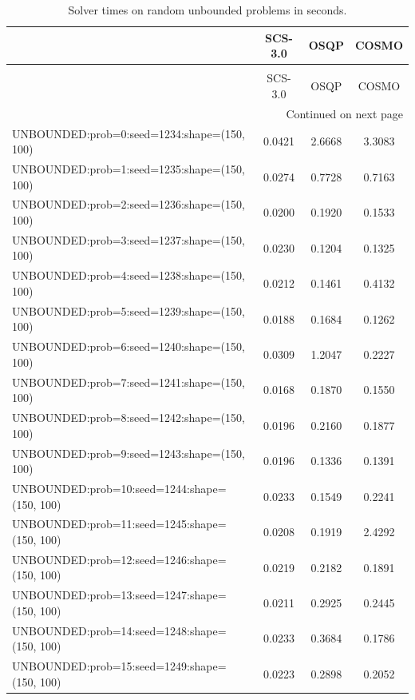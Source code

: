 \begin{longtable}{lccc}
\caption{Solver times on random unbounded problems in seconds.}
\label{t-random unbounded-results}\\
\toprule
{} &  SCS-3.0 &    OSQP &   COSMO \\
\midrule
\endfirsthead
\caption[]{Solver times on random unbounded problems in seconds.} \\
\toprule
{} &  SCS-3.0 &    OSQP &   COSMO \\
\midrule
\endhead
\midrule
\multicolumn{4}{r}{{Continued on next page}} \\
\midrule
\endfoot

\bottomrule
\endlastfoot
UNBOUNDED:prob=0:seed=1234:shape=(150, 100)   &   0.0421 &  2.6668 &  3.3083 \\
UNBOUNDED:prob=1:seed=1235:shape=(150, 100)   &   0.0274 &  0.7728 &  0.7163 \\
UNBOUNDED:prob=2:seed=1236:shape=(150, 100)   &   0.0200 &  0.1920 &  0.1533 \\
UNBOUNDED:prob=3:seed=1237:shape=(150, 100)   &   0.0230 &  0.1204 &  0.1325 \\
UNBOUNDED:prob=4:seed=1238:shape=(150, 100)   &   0.0212 &  0.1461 &  0.4132 \\
UNBOUNDED:prob=5:seed=1239:shape=(150, 100)   &   0.0188 &  0.1684 &  0.1262 \\
UNBOUNDED:prob=6:seed=1240:shape=(150, 100)   &   0.0309 &  1.2047 &  0.2227 \\
UNBOUNDED:prob=7:seed=1241:shape=(150, 100)   &   0.0168 &  0.1870 &  0.1550 \\
UNBOUNDED:prob=8:seed=1242:shape=(150, 100)   &   0.0196 &  0.2160 &  0.1877 \\
UNBOUNDED:prob=9:seed=1243:shape=(150, 100)   &   0.0196 &  0.1336 &  0.1391 \\
UNBOUNDED:prob=10:seed=1244:shape=(150, 100)  &   0.0233 &  0.1549 &  0.2241 \\
UNBOUNDED:prob=11:seed=1245:shape=(150, 100)  &   0.0208 &  0.1919 &  2.4292 \\
UNBOUNDED:prob=12:seed=1246:shape=(150, 100)  &   0.0219 &  0.2182 &  0.1891 \\
UNBOUNDED:prob=13:seed=1247:shape=(150, 100)  &   0.0211 &  0.2925 &  0.2445 \\
UNBOUNDED:prob=14:seed=1248:shape=(150, 100)  &   0.0233 &  0.3684 &  0.1786 \\
UNBOUNDED:prob=15:seed=1249:shape=(150, 100)  &   0.0223 &  0.2898 &  0.2052 \\

\end{longtable}

